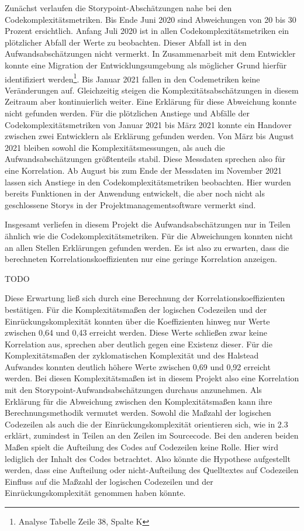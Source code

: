 Zunächst verlaufen die Storypoint-Abschätzungen nahe bei den
Codekomplexitätsmetriken. Bis Ende Juni 2020 sind Abweichungen von 20
bis 30 Prozent ersichtlich. Anfang Juli 2020 ist in allen
Codekomplexitätsmetriken ein plötzlicher Abfall der Werte zu beobachten.
Dieser Abfall ist in den Aufwandsabschätzungen nicht vermerkt. In
Zusammenarbeit mit dem Entwickler konnte eine Migration der
Entwicklungsumgebung als möglicher Grund hierfür identifiziert
werden\footnote{Analyse Tabelle Zeile 38, Spalte K}. Bis Januar 2021
fallen in den Codemetriken keine Veränderungen auf. Gleichzeitig steigen
die Komplexitätsabschätzungen in diesem Zeitraum aber kontinuierlich
weiter. Eine Erklärung für diese Abweichung konnte nicht gefunden
werden. Für die plötzlichen Anstiege und Abfälle der
Codekomplexitätsmetriken von Januar 2021 bis März 2021 konnte ein
Handover zwischen zwei Entwicklern als Erklärung gefunden werden. Von
März bis August 2021 bleiben sowohl die Komplexitätsmessungen, als auch
die Aufwandsabschätzungen größtenteils stabil. Diese Messdaten sprechen
also für eine Korrelation. Ab August bis zum Ende der Messdaten im
November 2021 lassen sich Anstiege in den Codekomplexitätsmetriken
beobachten. Hier wurden bereits Funktionen in der Anwendung entwickelt,
die aber noch nicht als geschlossene Storys in der
Projektmanagementsoftware vermerkt sind.

Insgesamt verliefen in diesem Projekt die Aufwandsabschätzungen nur in
Teilen ähnlich wie die Codekomplexitätsmetriken. Für die Abweichungen
konnten nicht an allen Stellen Erklärungen gefunden werden. Es ist also
zu erwarten, dass die berechneten Korrelationskoeffizienten nur eine
geringe Korrelation anzeigen.

TODO

Diese Erwartung ließ sich durch eine Berechnung der
Korrelationskoeffizienten bestätigen. Für die Komplexitätsmaßen der
logischen Codezeilen und der Einrückungskomplexität konnten über die
Koeffizienten hinweg nur Werte zwischen 0,64 und 0,43 erreicht werden.
Diese Werte schließen zwar keine Korrelation aus, sprechen aber deutlich
gegen eine Existenz dieser. Für die Komplexitätsmaßen der zyklomatischen
Komplexität und des Halstead Aufwandes konnten deutlich höhere Werte
zwischen 0,69 und 0,92 erreicht werden. Bei diesen Komplexitätsmaßen ist
in diesem Projekt also eine Korrelation mit den
Storypoint-Aufwandsabschätzungen durchaus anzunehmen. Als Erklärung für
die Abweichung zwischen den Komplexitätsmaßen kann ihre
Berechnungsmethodik vermutet werden. Sowohl die Maßzahl der logischen
Codezeilen als auch die der Einrückungskomplexität orientieren sich, wie
in 2.3 erklärt, zumindest in Teilen an den Zeilen im Sourcecode. Bei den
anderen beiden Maßen spielt die Aufteilung des Codes auf Codezeilen
keine Rolle. Hier wird lediglich der Inhalt des Codes betrachtet. Also
könnte die Hypothese aufgestellt werden, dass eine Aufteilung oder
nicht-Aufteilung des Quelltextes auf Codezeilen Einfluss auf die Maßzahl
der logischen Codezeilen und der Einrückungskomplexität genommen haben
könnte.

